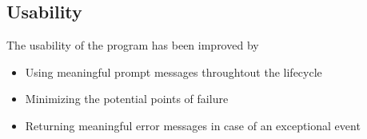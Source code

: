     \subsection{Usability}
    \begin{flushleft}
      The usability of the program has been improved by 
      \begin{itemize}
        \item {Using meaningful prompt messages throughtout the lifecycle }
        \item {Minimizing the potential points of failure }
        \item {Returning meaningful error messages in case of an exceptional event}
      \end{itemize}
    \end{flushleft}

